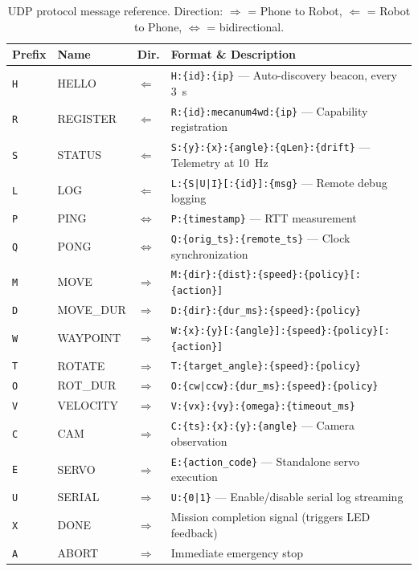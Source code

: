 \documentclass[12pt, a4paper, twoside]{article}
\begin{document}
\begin{table}[H]
    \centering
    \caption{UDP protocol message reference. Direction: $\Rightarrow$ = Phone to Robot, $\Leftarrow$ = Robot to Phone, $\Leftrightarrow$ = bidirectional.}
    \label{tab:protocol}
    \small
    \begin{tabularx}{\textwidth}{@{}lllX@{}}
        \toprule
        \textbf{Prefix} & \textbf{Name} & \textbf{Dir.} & \textbf{Format \& Description} \\
        \midrule
        \texttt{H} & HELLO    & $\Leftarrow$ & \texttt{H:\{id\}:\{ip\}} --- Auto-discovery beacon, every \SI{3}{\second} \\
        \texttt{R} & REGISTER & $\Leftarrow$ & \texttt{R:\{id\}:mecanum4wd:\{ip\}} --- Capability registration \\
        \texttt{S} & STATUS   & $\Leftarrow$ & \texttt{S:\{y\}:\{x\}:\{angle\}:\{qLen\}:\{drift\}} --- Telemetry at \SI{10}{\hertz} \\
        \texttt{L} & LOG      & $\Leftarrow$ & \texttt{L:\{S|U|I\}[:\{id\}]:\{msg\}} --- Remote debug logging \\
        \texttt{P} & PING     & $\Leftrightarrow$ & \texttt{P:\{timestamp\}} --- RTT measurement \\
        \texttt{Q} & PONG     & $\Leftrightarrow$ & \texttt{Q:\{orig\_ts\}:\{remote\_ts\}} --- Clock synchronization \\
        \texttt{M} & MOVE     & $\Rightarrow$ & \texttt{M:\{dir\}:\{dist\}:\{speed\}:\{policy\}[:\{action\}]} \\
        \texttt{D} & MOVE\_DUR & $\Rightarrow$ & \texttt{D:\{dir\}:\{dur\_ms\}:\{speed\}:\{policy\}} \\
        \texttt{W} & WAYPOINT & $\Rightarrow$ & \texttt{W:\{x\}:\{y\}[:\{angle\}]:\{speed\}:\{policy\}[:\{action\}]} \\
        \texttt{T} & ROTATE   & $\Rightarrow$ & \texttt{T:\{target\_angle\}:\{speed\}:\{policy\}} \\
        \texttt{O} & ROT\_DUR & $\Rightarrow$ & \texttt{O:\{cw|ccw\}:\{dur\_ms\}:\{speed\}:\{policy\}} \\
        \texttt{V} & VELOCITY & $\Rightarrow$ & \texttt{V:\{vx\}:\{vy\}:\{omega\}:\{timeout\_ms\}} \\
        \texttt{C} & CAM      & $\Rightarrow$ & \texttt{C:\{ts\}:\{x\}:\{y\}:\{angle\}} --- Camera observation \\
        \texttt{E} & SERVO    & $\Rightarrow$ & \texttt{E:\{action\_code\}} --- Standalone servo execution \\
        \texttt{U} & SERIAL   & $\Rightarrow$ & \texttt{U:\{0|1\}} --- Enable/disable serial log streaming \\
        \texttt{X} & DONE     & $\Rightarrow$ & Mission completion signal (triggers LED feedback) \\
        \texttt{A} & ABORT    & $\Rightarrow$ & Immediate emergency stop \\
        \bottomrule
    \end{tabularx}
\end{table}
\end{document}
